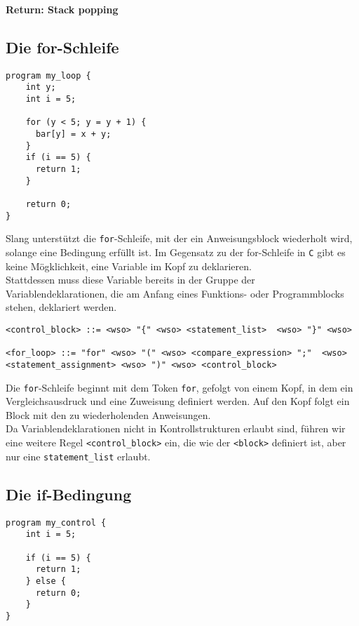 \textbf{Return: Stack popping}\\

\subsection{Die for-Schleife}

\begin{lstlisting}[caption={Slang Beispiel for-Schleife}]
program my_loop {
    int y;
    int i = 5;
    
    for (y < 5; y = y + 1) {
      bar[y] = x + y;
    }
    if (i == 5) {
      return 1;
    }

    return 0;
}
\end{lstlisting}

Slang unterstützt die \texttt{for}-Schleife, mit der ein Anweisungsblock wiederholt wird, solange eine Bedingung erfüllt ist.
Im Gegensatz zu der for-Schleife in \texttt{C} gibt es keine Mögklichkeit, eine Variable im Kopf zu deklarieren.\\
Stattdessen muss diese Variable bereits in der Gruppe der Variablendeklarationen, die am Anfang eines Funktions- oder Programmblocks stehen, deklariert werden.

\begin{lstlisting}[caption={Grammatikdefinition for-Schleife}]
<control_block> ::= <wso> "{" <wso> <statement_list>  <wso> "}" <wso>

<for_loop> ::= "for" <wso> "(" <wso> <compare_expression> ";"  <wso> <statement_assignment> <wso> ")" <wso> <control_block>
\end{lstlisting}

Die \texttt{for}-Schleife beginnt mit dem Token \texttt{for}, gefolgt von einem Kopf, in dem ein Vergleichsausdruck und eine Zuweisung definiert werden.
Auf den Kopf folgt ein Block mit den zu wiederholenden Anweisungen.\\

Da Variablendeklarationen nicht in Kontrollstrukturen erlaubt sind, führen wir eine weitere Regel \texttt{<control\_block>} ein, die wie der \texttt{<block>} definiert ist, aber nur eine \texttt{statement\_list} erlaubt.

\subsection{Die if-Bedingung}

\begin{lstlisting}[caption={Slang Beispiel if-Bedingung}]
program my_control {
    int i = 5;
    
    if (i == 5) {
      return 1;
    } else {
      return 0;
    }
}
\end{lstlisting}

